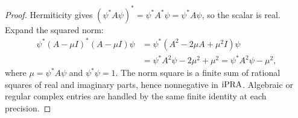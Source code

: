 \begin{proof}
Hermiticity gives
\((\psi^*A\psi)^*=\psi^*A^*\psi=\psi^*A\psi\), so the scalar is real.  Expand
the squared norm:
\begin{align*}
\psi^*(A-\mu I)^*(A-\mu I)\psi
 &=\psi^*(A^2-2\mu A+\mu^2I)\psi\\
 &=\psi^*A^2\psi-2\mu^2+\mu^2
 =\psi^*A^2\psi-\mu^2,
\end{align*}
where \(\mu=\psi^*A\psi\) and \(\psi^*\psi=1\).  The norm square is a finite
sum of rational squares of real and imaginary parts, hence nonnegative in
\(\mathrm{iPRA}\).  Algebraic or regular complex entries are handled by the same
finite identity at each precision.
\end{proof}
